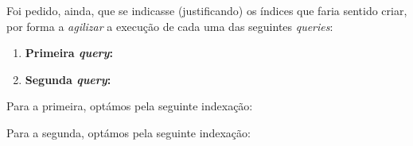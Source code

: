 \documentclass[12pt,a4paper]{article}
\begin{document}
  Foi pedido, ainda, que se indicasse (justificando) os índices que faria sentido
  criar, por forma a \textit{agilizar} a execução de cada uma das seguintes \textit{queries}:

  \begin{enumerate}
    \item \textbf{Primeira \textit{query}:}
    
    

    \item \textbf{Segunda \textit{query}:}
  
    
  \end{enumerate}
  
  Para a primeira, optámos pela seguinte indexação:


  Para a segunda, optámos pela seguinte indexação:

\end{document}

